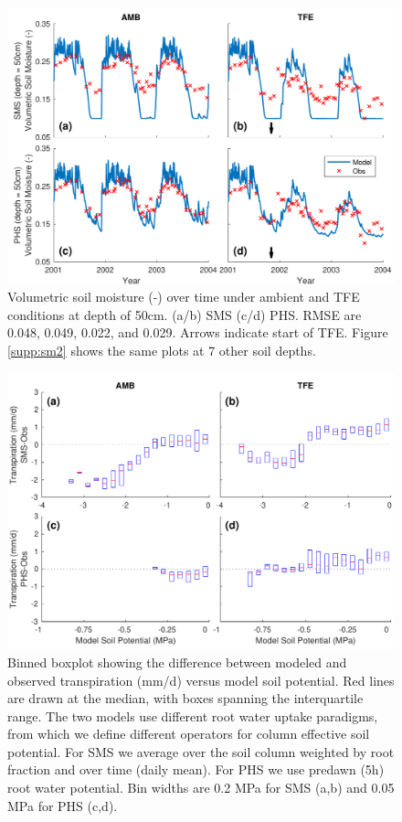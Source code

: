 \documentclass[draft,linenumbers]{agujournal}
\begin{document}
        \clearpage
    \begin{figure}[h]
     \centering
     \includegraphics[width=30pc]{../figs3/sm2.pdf}
     \caption{Volumetric soil moisture (-) over time under ambient and TFE conditions at depth of 50cm.
     (a/b) SMS
     (c/d) PHS.
     RMSE are 0.048, 0.049, 0.022, and 0.029.
     Arrows indicate start of TFE. Figure \ref{supp:sm2} shows the same plots at 7 other soil depths. }
     \label{fig:sm2}
  \end{figure}

              \begin{figure}[h]
     \centering
     \includegraphics[width=30pc]{../figs3/sm3.pdf}
     \caption{Binned boxplot showing the difference between modeled and observed transpiration (mm/d) versus model soil potential.
     Red lines are drawn at the median, with boxes spanning the interquartile range.
     The two models use different root water uptake paradigms, from which we define different operators for column effective soil potential.
     For SMS we average over the soil column weighted by root fraction and over time (daily mean).
     For PHS we use predawn (5h) root water potential.
     Bin widths are 0.2 MPa for SMS (a,b) and 0.05 MPa for PHS (c,d).
}
     \label{fig:cool}
  \end{figure}
          \clearpage
\end{document}
